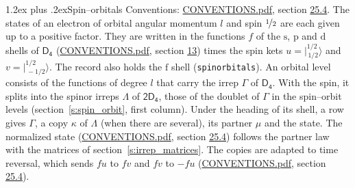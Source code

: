 \documentclass[10pt,a4paper]{article}
\makeatletter
\renewcommand\section{\@startsection{section}{1}{\z@}{-3ex plus -1ex minus -.2ex}%
  {1.2ex plus .2ex}{\normalfont\large\sffamily\bfseries\color{parttitle}}}
\numberwithin{equation}{section}
\newcommand{\grp}[1]{\mathsf{#1}}
\newcommand{\orbital}[1]{\mathrm{#1}}
\newcommand{\mult}{\kappa}
\newcommand{\intx}{\mu}
\newcommand{\jm}[2]{\bigl\lvert{}^{#1}_{\,#2}\bigr\rangle}
\makeatother
\begin{document}
\section{Spin--orbitals}\label{s:spin_orbitals}
Conventions: \href{../../CONVENTIONS.pdf}{CONVENTIONS.pdf}, section \href{../../CONVENTIONS.pdf\#conv.25.4}{25.4}.
\leavevmode\label{n:index.orbital.l}The states of an electron of orbital angular momentum $l$ and spin $\nicefrac{1}{2}$ are each given up to a positive factor. \label{n:local.spinor.uv}\label{n:local.function.f}They are written in the functions $f$ of the $\orbital{s}$, $\orbital{p}$ and $\orbital{d}$ shells of \href{../../../rotation/data/pdf/D4.pdf}{$\grp{D_{4}}$} (\href{../../CONVENTIONS.pdf}{CONVENTIONS.pdf}, section \href{../../../rotation/CONVENTIONS.pdf\#conv.13}{13}) times the spin kets $u = \jm{1/2}{1/2}$ and $v = \jm{1/2}{-1/2}$. The record also holds the $\orbital{f}$ shell (\texttt{spinorbitals}). An orbital level consists of the functions of degree $l$ that carry the irrep $\Gamma$ of \href{../../../rotation/data/pdf/D4.pdf}{$\grp{D_{4}}$}. With the spin, it splits into the spinor irreps $\Lambda$ of $\grp{2D_{4}}$, those of the doublet of $\Gamma$ in the spin--orbit levels (section~\ref{s:spin_orbit}, first column). \label{n:head.state}Under the heading of its shell, a row gives $\Gamma$, a copy $\mult$ of $\Lambda$ (when there are several), its partner $\intx$ and the state. The normalized state (\href{../../CONVENTIONS.pdf}{CONVENTIONS.pdf}, section \href{../../CONVENTIONS.pdf\#conv.25.4}{25.4}) follows the partner law with the matrices of section~\ref{s:irrep_matrices}. The copies are adapted to time reversal, which sends $f u$ to $f v$ and $f v$ to $-f u$ (\href{../../CONVENTIONS.pdf}{CONVENTIONS.pdf}, section \href{../../CONVENTIONS.pdf\#conv.25.4}{25.4}).
\end{document}
